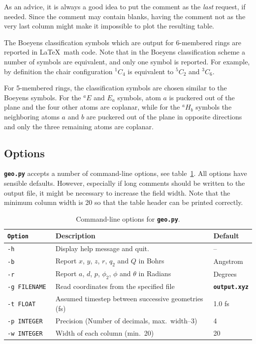 \documentclass[a4paper,11pt,DIV=15,openany,twoside=false]{scrbook}
\newcommand{\ttt}[1]{\textbf{\texttt{#1}}}
\begin{document}
As an advice, it is always a good idea to put the comment as the \textit{last} request, if needed. Since the comment may contain blanks, having the comment not as the very last column might make it impossible to plot the resulting table.

The Boeyens classification symbols which are output for 6-membered rings are reported in \LaTeX\ math code. Note that in the Boeyens classification scheme a number of symbols are equivalent, and only one symbol is reported. For example, by definition the chair configuration $^1C_4$ is equivalent to $^5C_2$ and $^3C_6$.

For 5-membered rings, the classification symbols are chosen similar to the Boeyens symbols. For the $^aE$ and $E_a$ symbols, atom $a$ is puckered out of the plane and the four other atoms are coplanar, while for the $^aH_b$ symbols the neighboring atoms $a$ and $b$ are puckered out of the plane in opposite directions and only the three remaining atoms are coplanar.

\subsection{Options}

\ttt{geo.py} accepts a number of command-line options, see table~\ref{tab:Geo_options}. All options have sensible defaults. However, especially if long comments should be written to the output file, it might be necessary to increase the field width. Note that the minimum column width is 20 so that the table header can be printed correctly.

\begin{table}[h]
  \centering
  \caption{Command-line options for \ttt{geo.py}. }
  \label{tab:Geo_options}
  \begin{tabular}{>{\tt}lll}
    \toprule
    \rmfamily Option         &Description    &Default\\
    \midrule
    -h          &Display help message and quit.         & --        \\
    -b          &Report $x$, $y$, $z$, $r$, $q_2$ and $Q$ in Bohrs       &Angstrom\\
    -r          &Report $a$, $d$, $p$, $\phi_2$, $\phi$ and $\theta$ in Radians         &Degrees\\
    -g FILENAME &Read coordinates from the specified file       &\ttt{output.xyz}\\
    -t FLOAT    &Assumed timestep between successive geometries (fs)    &1.0 fs\\
    -p INTEGER  &Precision (Number of decimals, max.~width--3)         &4\\
    -w INTEGER  &Width of each column (min.~20)                   &20\\
    \bottomrule
  \end{tabular}
\end{table}
\end{document}
